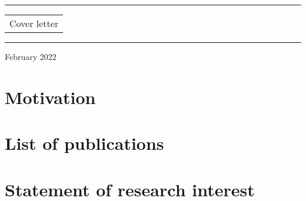 \documentclass{cvf}
\begin{document}
\thispagestyle{empty}
\begin{center}

    \vspace{5cm}
    \par\noindent\rule[1ex]{\textwidth}{1.5pt}
    {\Huge \begin{tabular}{c}
            Cover letter
        \end{tabular} }
    \par\noindent\rule{\textwidth}{1.5pt}
    \vspace{2cm}
    \par{}
    \vfill
    February 2022
\end{center}



\setcounter{tocdepth}{1}
\tableofcontents

\chapter{Motivation}




\chapter{List of publications}


\chapter{Statement of research interest}

\end{document}
